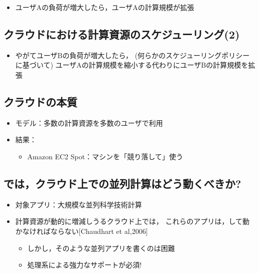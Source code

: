 \documentclass[25pt,papersize,landscape]{jsarticle}
\begin{document}
\begin{itemize}
\item ユーザAの負荷が増大したら，ユーザAの計算規模が拡張
\end{itemize}


\subsection{クラウドにおける計算資源のスケジューリング(2)}

\begin{itemize}
\item やがてユーザBの負荷が増大したら，
  (何らかのスケジューリングポリシーに基づいて)
  ユーザAの計算規模を縮小する代わりにユーザBの計算規模を拡張
\end{itemize}


\subsection{クラウドの本質}

\begin{itemize}
\item モデル：多数の計算資源を多数のユーザで利用
\item 結果：
  \begin{itemize}
  \item Amazon EC2 Spot：マシンを「競り落して」使う
  \end{itemize}
\end{itemize}


\subsection{では，クラウド上での並列計算はどう動くべきか?}

\begin{itemize}
\item 対象アプリ：大規模な並列科学技術計算
\item 計算資源が動的に増減しうるクラウド上では，
  これらのアプリは，して動かなければならない{\scriptsize[Chaudhart et al,2006]}
  \begin{itemize}
  \item しかし，そのような並列アプリを書くのは困難
  \item 処理系による強力なサポートが必須!
  \end{itemize}
\end{itemize}
\end{document}

